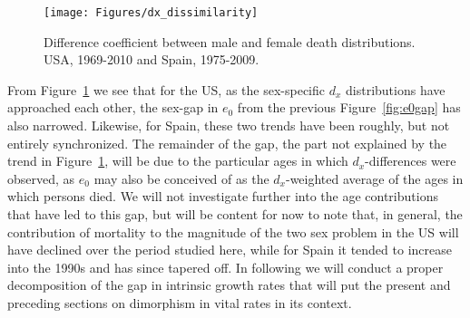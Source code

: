 \begin{figure}[!ht]
  \centering
    \caption{Difference coefficient between male and female death distributions.
    USA, 1969-2010 and Spain, 1975-2009.}
     \texttt{[image: Figures/dx\_dissimilarity]}
     \label{fig:dxtheta}
\end{figure}

From Figure~\ref{fig:dxtheta} we see that for the US, as the sex-specific $d_x$
distributions have approached each other, the sex-gap in $e_0$ from the previous
Figure~\ref{fig:e0gap} has also narrowed. Likewise, for Spain, these two trends
have been roughly, but not entirely synchronized. The remainder of the gap, the
part not explained by the trend in Figure~\ref{fig:dxtheta}, will be due to the
particular ages in which $d_x$-differences were observed, as $e_0$ may also be
conceived of as the $d_x$-weighted average of the ages in which persons died. We
will not investigate further into the age contributions that have led to this
gap, but will be content for now to note that, in general, the
contribution of mortality to the magnitude of the two sex problem in the US will
have declined over the period studied here, while for Spain it tended to
increase into the 1990s and has since tapered off. In following we will conduct
a proper decomposition of the gap in intrinsic growth rates that will put the
present and preceding sections on dimorphism in vital rates in its context.

 \FloatBarrier
